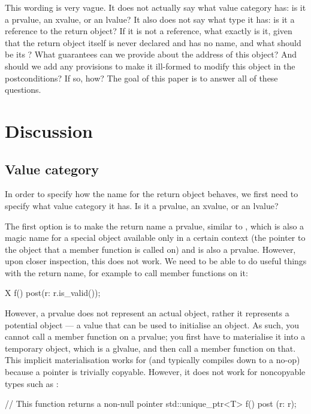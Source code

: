 This wording is very vague. It does not actually say what value category  has: is it a prvalue, an xvalue, or an lvalue? It also does not say what type it has: is it a reference to the return object? If it is not a reference, what exactly is it, given that the return object itself is never declared and has no name, and what should be its ? What guarantees can we provide about the address of this object?
And should we add any provisions to make it ill-formed to modify this object in the postconditions? If so, how?  The goal of this paper is to answer all of these questions.

\section{Discussion}

\subsection{Value category}

In order to specify how the name for the return object behaves, we first need to specify what value category it has. Is it a prvalue, an xvalue, or an lvalue?

\pagebreak %

The first option is to make the return name a prvalue, similar to , which is also a magic name for a special object available only in a certain context (the pointer to the object that a member function is called on) and is also a prvalue. However, upon closer inspection, this does not work. We need to be able to do useful things with the return name, for example to call member functions on it:

\begin{codeblock}
X f()
  post(r: r.is_valid());
\end{codeblock}

However, a prvalue does not represent an actual object, rather it represents a potential object --- a value that can be used to initialise an object. As such, you cannot call a member function on a prvalue; you first have to materialise it into a temporary object, which is a glvalue, and then call a member function on that. This implicit materialisation works for  (and typically compiles down to a no-op) because a pointer is trivially copyable. However, it does not work for noncopyable types such as :

\begin{codeblock}
// This function returns a non-null pointer
std::unique_ptr<T> f()
  post (r: r);
\end{codeblock}

